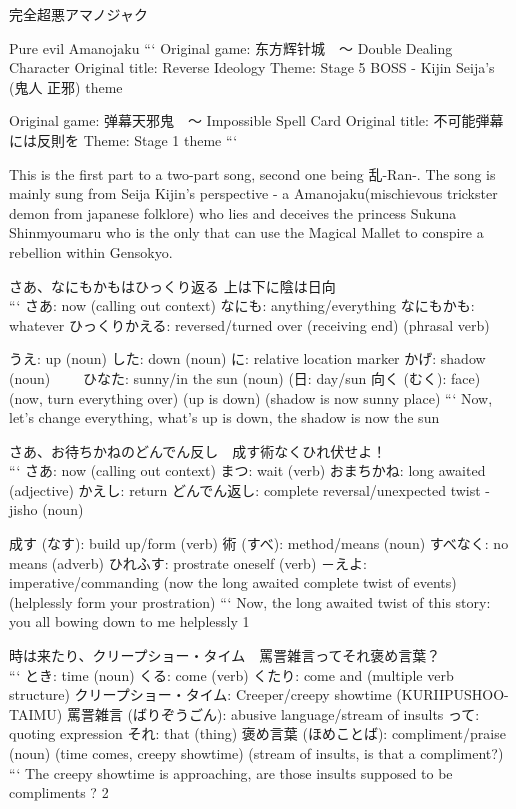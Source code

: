 完全超悪アマノジャク

Pure evil Amanojaku
```
Original game: 东方辉针城　～ Double Dealing Character
Original title: Reverse Ideology
Theme: Stage 5 BOSS - Kijin Seija's (鬼人 正邪) theme

Original game: 弹幕天邪鬼　～ Impossible Spell Card
Original title: 不可能弾幕には反則を
Theme: Stage 1 theme
```

This is the first part to a two-part song, second one being 乱-Ran-. The song is mainly sung from Seija Kijin's perspective - a Amanojaku(mischievous trickster demon from japanese folklore)
who lies and deceives the princess Sukuna Shinmyoumaru who is the only that can use the Magical Mallet to conspire a rebellion within Gensokyo.

さあ、なにもかもはひっくり返る 上は下に陰は日向 \\
```
さあ: now (calling out context)
なにも: anything/everything
なにもかも: whatever
ひっくりかえる: reversed/turned over (receiving end) (phrasal verb)

    うえ: up (noun)
    した: down (noun)
    に: relative location marker
    かげ: shadow (noun)
　　ひなた: sunny/in the sun (noun) (日: day/sun 向く (むく): face)
(now, turn everything over) (up is down) (shadow is now sunny place)
```
Now, let's change everything, what's up is down, the shadow is now the sun

さあ、お待ちかねのどんでん反し　成す術なくひれ伏せよ！ \\
```
さあ: now (calling out context)
まつ: wait (verb)
おまちかね: long awaited (adjective)
かえし: return
どんでん返し: complete reversal/unexpected twist - jisho (noun)

成す (なす): build up/form (verb)
術 (すべ): method/means (noun)
すべなく: no means (adverb)
ひれふす: prostrate oneself (verb)
－えよ: imperative/commanding
(now the long awaited complete twist of events) (helplessly form your prostration)
```
Now, the long awaited twist of this story: you all bowing down to me helplessly {1}

時は来たり、クリープショー・タイム　罵詈雑言ってそれ褒め言葉？ \\
```
とき: time (noun)
くる: come (verb)
くたり: come and (multiple verb structure)
クリープショー・タイム: Creeper/creepy showtime (KURIIPUSHOO-TAIMU)
                              罵詈雑言 (ばりぞうごん): abusive language/stream of insults
                                        って: quoting expression
                                            それ: that (thing)
                                              褒め言葉 (ほめことば): compliment/praise (noun)
(time comes, creepy showtime) (stream of insults, is that a compliment?)
```
The creepy showtime is approaching, are those insults supposed to be compliments ? {2}

